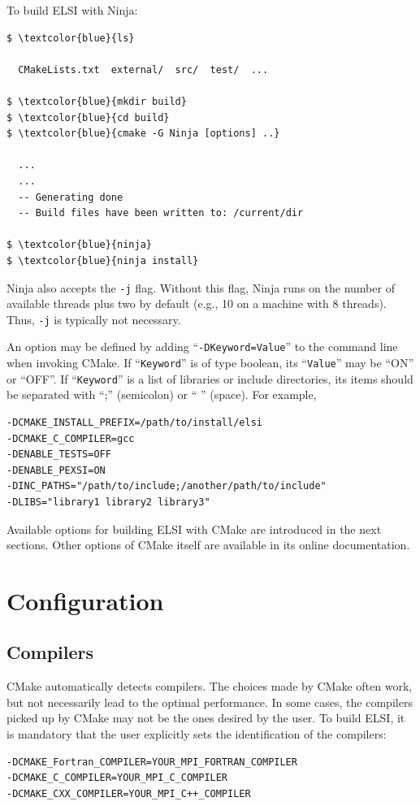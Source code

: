 \documentclass{report}
\begin{document}
To build ELSI with Ninja:
\begin{tcolorbox}
\begin{Verbatim}[commandchars=\\\{\}]
$ \textcolor{blue}{ls}

  CMakeLists.txt  external/  src/  test/  ...

$ \textcolor{blue}{mkdir build}
$ \textcolor{blue}{cd build}
$ \textcolor{blue}{cmake -G Ninja [options] ..}

  ...
  ...
  -- Generating done
  -- Build files have been written to: /current/dir

$ \textcolor{blue}{ninja}
$ \textcolor{blue}{ninja install}
\end{Verbatim}
\end{tcolorbox}

Ninja also accepts the \verb+-j+ flag.  Without this flag, Ninja runs on the number of available threads plus two by default (e.g., 10 on a machine with 8 threads).  Thus, \verb+-j+ is typically not necessary.

An option may be defined by adding ``\verb+-DKeyword=Value+'' to the command line when invoking CMake.  If ``\verb+Keyword+'' is of type boolean, its ``\verb+Value+'' may be ``ON'' or ``OFF''.  If ``\verb+Keyword+'' is a list of libraries or include directories, its items should be separated with ``;'' (semicolon) or `` '' (space).  For example,
\begin{tcolorbox}
\begin{verbatim}
-DCMAKE_INSTALL_PREFIX=/path/to/install/elsi
-DCMAKE_C_COMPILER=gcc
-DENABLE_TESTS=OFF
-DENABLE_PEXSI=ON
-DINC_PATHS="/path/to/include;/another/path/to/include"
-DLIBS="library1 library2 library3"
\end{verbatim}
\end{tcolorbox}

Available options for building ELSI with CMake are introduced in the next sections.  Other options of CMake itself are available in its online documentation.

\section{Configuration}
\label{sec:config}
\subsection{Compilers}
\label{subsec:config_compilers}
CMake automatically detects compilers.  The choices made by CMake often work, but not necessarily lead to the optimal performance.  In some cases, the compilers picked up by CMake may not be the ones desired by the user.  To build ELSI, it is mandatory that the user explicitly sets the identification of the compilers:
\begin{tcolorbox}
\begin{verbatim}
-DCMAKE_Fortran_COMPILER=YOUR_MPI_FORTRAN_COMPILER
-DCMAKE_C_COMPILER=YOUR_MPI_C_COMPILER
-DCMAKE_CXX_COMPILER=YOUR_MPI_C++_COMPILER
\end{verbatim}
\end{tcolorbox}
\end{document}
